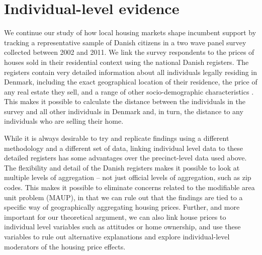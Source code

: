 \documentclass[12pt,a4paper]{article}
\begin{document}
\section{Individual-level evidence}\label{individuallevel}
We continue our study of how local housing markets shape incumbent support by tracking a representative sample of Danish citizens in a two wave panel survey collected between 2002 and 2011. We link the survey respondents to the prices of houses sold in their residential context using the national Danish registers. The registers contain very detailed information about all individuals legally residing in Denmark, including the exact geographical location of their residence, the price of any real estate they sell, and a range of other socio-demographic characteristics \citep{thygesen2011introduction}. This makes it possible to calculate the distance between the individuals in the survey and all other individuals in Denmark and, in turn, the distance to any individuals who are selling their home. 
 
 While it is always desirable to try and replicate findings using a different methodology and a different set of data, linking individual level data to these detailed registers has some advantages over the precinct-level data used above. The flexibility and detail of the Danish registers makes it possible to look at multiple levels of aggregation -- not just official levels of aggregation, such as zip codes. This makes it possible to eliminate concerns related to the modifiable area unit problem (MAUP), in that we can rule out that the findings are tied to a specific way of geographically aggregating housing prices. Further, and more important for our theoretical argument, we can also link house prices to individual level variables such as attitudes or home ownership, and use these variables to rule out alternative explanations and explore individual-level moderators of the housing price effects.
\end{document}
